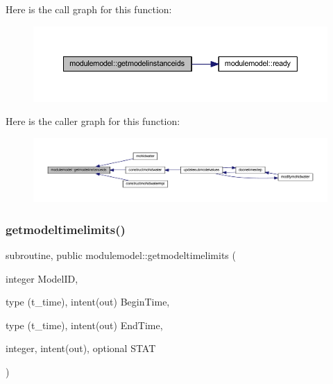 Here is the call graph for this function\+:\nopagebreak
\begin{figure}[H]
\begin{center}
\leavevmode
\includegraphics[width=350pt]{namespacemodulemodel_a542c4b413e51723c7c3826e7a1e3b8a6_cgraph}
\end{center}
\end{figure}
Here is the caller graph for this function\+:\nopagebreak
\begin{figure}[H]
\begin{center}
\leavevmode
\includegraphics[width=350pt]{namespacemodulemodel_a542c4b413e51723c7c3826e7a1e3b8a6_icgraph}
\end{center}
\end{figure}
\mbox{\label{namespacemodulemodel_a4273c6982391135a62686fbcf6a0861c}} 
\subsubsection{\texorpdfstring{getmodeltimelimits()}{getmodeltimelimits()}}
{\footnotesize\ttfamily subroutine, public modulemodel\+::getmodeltimelimits (\begin{DoxyParamCaption}\item[{integer}]{Model\+ID,  }\item[{type (t\+\_\+time), intent(out)}]{Begin\+Time,  }\item[{type (t\+\_\+time), intent(out)}]{End\+Time,  }\item[{integer, intent(out), optional}]{S\+T\+AT }\end{DoxyParamCaption})}

